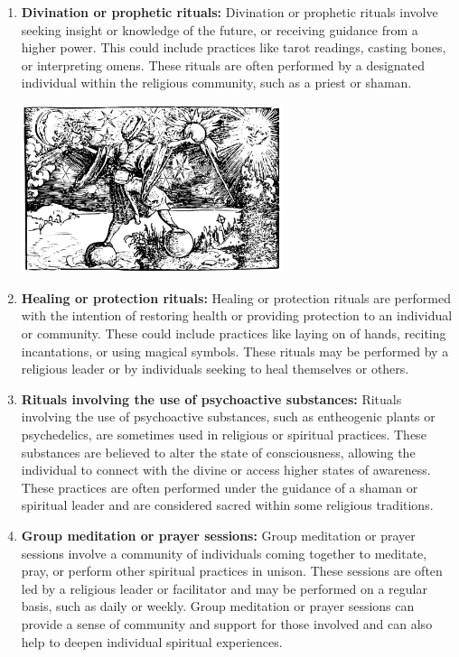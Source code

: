 \documentclass[12pt]{book}
\begin{document}
\begin{enumerate}
    \item \textbf{Divination or prophetic rituals:}
    Divination or prophetic rituals involve seeking insight or knowledge of the future, or receiving guidance from a higher power. This could include practices like tarot readings, casting bones, or interpreting omens. These rituals are often performed by a designated individual within the religious community, such as a priest or shaman.
    
    \begin{center}
        \includegraphics[width=0.6\textwidth]{./images/religion08.pdf}
    \end{center}

    \item \textbf{Healing or protection rituals:}
    Healing or protection rituals are performed with the intention of restoring health or providing protection to an individual or community. These could include practices like laying on of hands, reciting incantations, or using magical symbols. These rituals may be performed by a religious leader or by individuals seeking to heal themselves or others.

    \item \textbf{Rituals involving the use of psychoactive substances:}
    Rituals involving the use of psychoactive substances, such as entheogenic plants or psychedelics, are sometimes used in religious or spiritual practices. These substances are believed to alter the state of consciousness, allowing the individual to connect with the divine or access higher states of awareness. These practices are often performed under the guidance of a shaman or spiritual leader and are considered sacred within some religious traditions.

    \item \textbf{Group meditation or prayer sessions:}
    Group meditation or prayer sessions involve a community of individuals coming together to meditate, pray, or perform other spiritual practices in unison. These sessions are often led by a religious leader or facilitator and may be performed on a regular basis, such as daily or weekly. Group meditation or prayer sessions can provide a sense of community and support for those involved and can also help to deepen individual spiritual experiences.
    

\end{enumerate}
\end{document}
